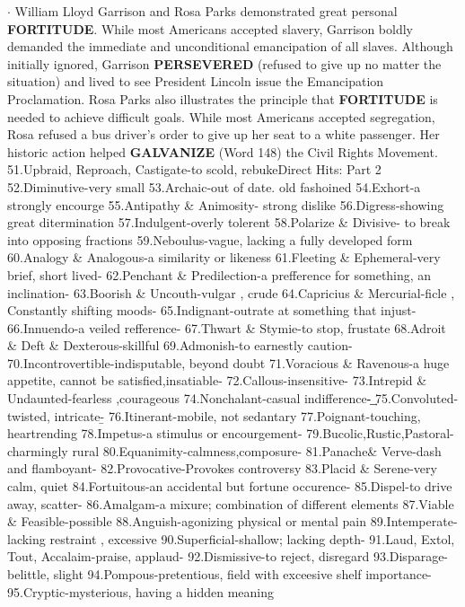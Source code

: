 \documentclass{exam}
\begin{document}
\begin{questions}
$\cdot$ William Lloyd Garrison and Rosa Parks demonstrated great personal \textbf{FORTITUDE}. While most Americans accepted slavery, Garrison boldly demanded the immediate and unconditional emancipation of all slaves. Although initially ignored, Garrison \textbf{PERSEVERED} (refused to give up no matter the situation) and lived to see President Lincoln issue the Emancipation Proclamation. Rosa Parks also illustrates the principle that \textbf{FORTITUDE} is needed to achieve difficult goals. While most Americans accepted segregation, Rosa refused a bus driver's order to give up her seat to a white passenger. Her historic action helped \textbf{GALVANIZE} (Word 148) the Civil Rights Movement.
\clearpage
51.Upbraid, Reproach, Castigate-to scold, rebukeDirect Hits: Part 2
52.Diminutive-very small
53.Archaic-out of date. old fashoined
54.Exhort-a strongly encourge
55.Antipathy \& Animosity- strong dislike
56.Digress-showing great ditermination
57.Indulgent-overly tolerent
58.Polarize \& Divisive- to break into opposing fractions
59.Neboulus-vague, lacking a fully developed form
60.Analogy \& Analogous-a similarity or likeness
61.Fleeting \& Ephemeral-very brief, short lived-
62.Penchant \& Predilection-a prefference for something, an inclination-
63.Boorish \& Uncouth-vulgar , crude
64.Capricius \& Mercurial-ficle , Constantly shifting moods-
65.Indignant-outrate at something that injust-
66.Innuendo-a veiled refference-
67.Thwart \& Stymie-to stop, frustate
68.Adroit \& Deft \& Dexterous-skillful
69.Admonish-to earnestly caution-
70.Incontrovertible-indisputable, beyond doubt
71.Voracious \& Ravenous-a huge appetite, cannot be satisfied,insatiable-
72.Callous-insensitive-
73.Intrepid \& Undaunted-fearless ,courageous
74.Nonchalant-casual indifference-͢
75.Convoluted-twisted, intricate-̲
76.Itinerant-mobile, not sedantary
77.Poignant-touching, heartrending
78.Impetus-a stimulus or encourgement-
79.Bucolic,Rustic,Pastoral-charmingly rural
80.Equanimity-calmness,composure-
81.Panache\& Verve-dash and flamboyant-
82.Provocative-Provokes controversy
83.Placid \& Serene-very calm, quiet
84.Fortuitous-an accidental but fortune occurence-
85.Dispel-to drive away, scatter-
86.Amalgam-a mixure; combination of different elements
87.Viable \& Feasible-possible
88.Anguish-agonizing physical or mental pain
89.Intemperate-lacking restraint , excessive
90.Superficial-shallow; lacking depth-
91.Laud, Extol, Tout, Accalaim-praise, applaud- 
92.Dismissive-to reject, disregard
93.Disparage- belittle, slight
94.Pompous-pretentious, field with exceesive shelf importance-
95.Cryptic-mysterious, having a hidden meaning

\end{questions}
\end{document}
